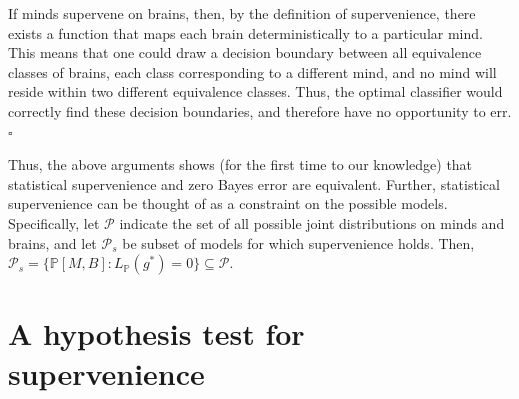 \documentclass{article}
\newcommand{\PP}{\mathbb{P}}           %
\providecommand{\mc}[1]{\mathcal{#1}}
\begin{document}
\noindent If minds supervene on brains, then, by the definition of supervenience, there exists a function that maps each brain deterministically to a particular mind.  This means that one could draw a decision boundary between all equivalence classes of brains, each class corresponding to a different mind, and no mind will reside within two different equivalence classes.  Thus, the optimal classifier would correctly find these decision boundaries, and therefore have no opportunity to err. $\square$

Thus, the above arguments shows (for the first time to our knowledge) that statistical supervenience and zero Bayes error are equivalent. Further, statistical supervenience can be thought of as a constraint on the possible models.  Specifically, let $\mc{P}$ indicate the set of all possible joint distributions on minds and brains, and let $\mc{P}_s$ be subset of models for which supervenience holds.  Then, $\mc{P}_s = \{\PP[M,B] : L_{\PP}(g^*)=0\} \subseteq \mc{P}$.


\section{A hypothesis test for supervenience} %
\label{sub:hypothesis_testing}
\end{document}

